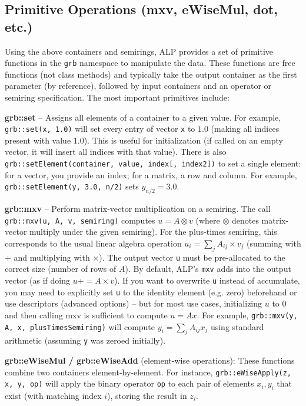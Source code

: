 \subsection{Primitive Operations (mxv, eWiseMul, dot, etc.)}

Using the above containers and semirings, ALP provides a set of primitive functions in the \texttt{grb} namespace to manipulate the data. These functions are free functions (not class methods) and typically take the output container as the first parameter (by reference), followed by input containers and an operator or semiring specification. The most important primitives include:

    \textbf{grb::set} – Assigns all elements of a container to a given value. For example, \texttt{grb::set(x, 1.0)} will set every entry of vector \texttt{x} to $1.0$ (making all indices present with value 1.0). This is useful for initialization (if called on an empty vector, it will insert all indices with that value). There is also \texttt{grb::setElement(container, value, index[, index2])} to set a single element: for a vector, you provide an index; for a matrix, a row and column. For example, \texttt{grb::setElement(y, 3.0, n/2)} sets $y_{n/2} = 3.0$.
\newline

    \textbf{grb::mxv} – Perform matrix-vector multiplication on a semiring. The call \texttt{grb::mxv(u, A, v, semiring)} computes $u = A \otimes v$ (where $\otimes$ denotes matrix-vector multiply under the given semiring). For the plus-times semiring, this corresponds to the usual linear algebra operation $u_i = \sum_j A_{ij} \times v_j$ (summing with + and multiplying with $\times$). The output vector \texttt{u} must be pre-allocated to the correct size (number of rows of $A$). By default, ALP’s \texttt{mxv} adds into the output vector (as if doing $u += A \times v$). If you want to overwrite \texttt{u} instead of accumulate, you may need to explicitly set \texttt{u} to the identity element (e.g. zero) beforehand or use descriptors (advanced options) – but for most use cases, initializing $u$ to 0 and then calling mxv is sufficient to compute $u = A x$. For example, \texttt{grb::mxv(y, A, x, plusTimesSemiring)} will compute $y_i = \sum_j A_{ij} x_j$ using standard arithmetic (assuming \texttt{y} was zeroed initially).
\newline


        \textbf{grb::eWiseMul / grb::eWiseAdd} (element-wise operations): These functions combine two containers element-by-element. For instance, \texttt{grb::eWiseApply(z, x, y, op)} will apply the binary operator \texttt{op} to each pair of elements $x_i, y_i$ that exist (with matching index $i$), storing the result in $z_i$.

